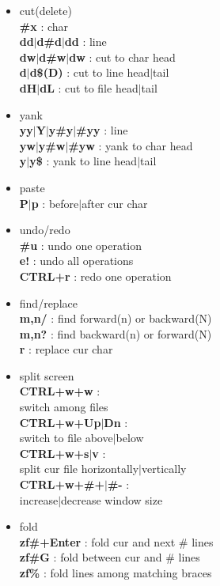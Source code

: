 \documentclass[10pt, a4paper]{article}
\begin{document}
\begin{enumerate}
\begin{itemize}
    \item cut(delete) \\
    \textbf{\#x} : char \\
    \textbf{dd{$|$}d\#d{$|$}dd} : line \\
    \textbf{dw{$|$}d\#w{$|$}dw} : cut to char head \\
    \textbf{d\^{$|$}d\$(D)} : cut to line head{$|$}tail \\
    \textbf{dH{$|$}dL} : cut to file head{$|$}tail
    \item yank \\
    \textbf{yy{$|$}Y{$|$}y\#y{$|$}\#yy} : line \\
    \textbf{yw{$|$}y\#w{$|$}\#yw} : yank to char head \\
    \textbf{y\^{$|$}y\$} : yank to line head{$|$}tail
    \item paste \\
    \textbf{P{$|$}p} : before{$|$}after cur char
    \item undo/redo \\
    \textbf{\#u} : undo one operation\\
    \textbf{e!} : undo all operations \\
    \textbf{CTRL+r} : redo one operation
    \item find/replace \\
    \textbf{m,n/} : find forward(n) or backward(N) \\
    \textbf{m,n?} : find backward(n) or forward(N) \\
    \textbf{r} : replace cur char
    \item split screen \\
    \textbf{CTRL+w+w} : \\ switch among files \\
    \textbf{CTRL+w+Up{$|$}Dn} : \\ switch to file above{$|$}below \\
    \textbf{CTRL+w+s{$|$}v} : \\ split cur file horizontally{$|$}vertically \\
    \textbf{CTRL+w+\#+{$|$}\#-} : \\ increase{$|$}decrease window size
    \item fold \\
    \textbf{zf\#+Enter} : fold cur and next \# lines \\
    \textbf{zf\#G} : fold between cur and \# lines \\
    \textbf{zf\%} : fold lines among matching braces \\

\end{itemize}
\end{enumerate}
\end{document}
